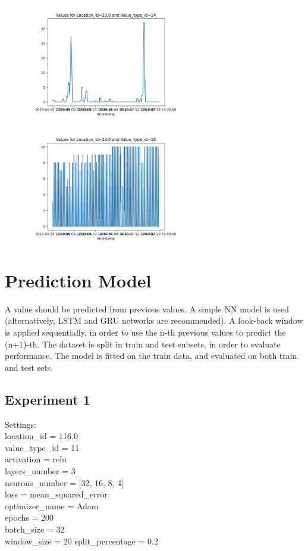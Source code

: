 \documentclass{foxelas_report}
\begin{document}
\begin{figure}[H]
\includegraphics[width=0.6\textwidth]{vis_data_14_23.0.png}
\end{figure}

\begin{figure}[H]
\includegraphics[width=0.6\textwidth]{vis_data_16_23.0.png}
\end{figure}

\section{Prediction Model}
A value should be predicted from previous values. A simple NN model is used (alternatively, LSTM and GRU networks are recommended).  A look-back window is applied sequentially, in order to use the n-th previous values to predict the (n+1)-th. The dataset is split in train and test subsets, in order to evaluate performance. The model is fitted on the train data, and evaluated on both train and test sets.\\

\subsection{Experiment 1}

Settings:\\
location\_id = 116.0\\
value\_type\_id = 11\\
activation = relu\\
layers\_number = 3\\
neurons\_number = [32, 16, 8, 4]\\
loss = mean\_squared\_error\\
optimizer\_name = Adam\\
epochs = 200\\
batch\_size = 32\\
window\_size = 20
split\_percentage = 0.2
\end{document}
